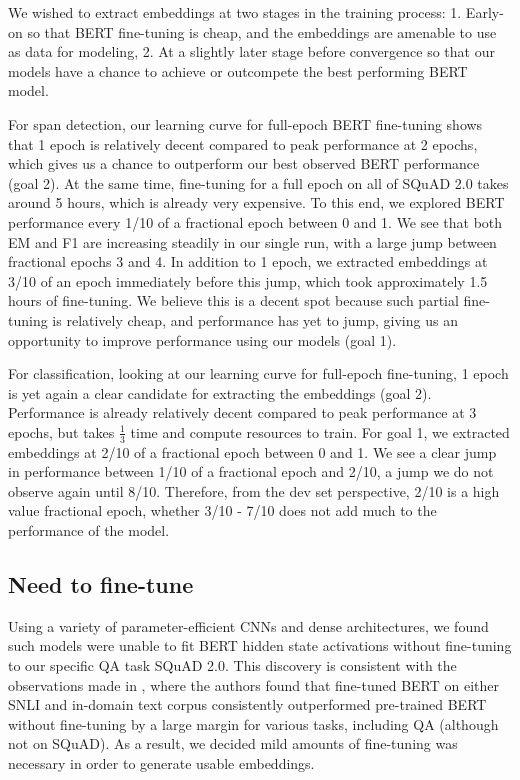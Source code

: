 We wished to extract embeddings at two stages in the training process: 1. Early-on so that BERT fine-tuning is cheap, and the embeddings are amenable to use as data for modeling, 2. At a slightly later stage before convergence so that our models have a chance to achieve or outcompete the best performing BERT model. 

For span detection, our learning curve for full-epoch BERT fine-tuning shows that 1 epoch is relatively decent compared to peak performance at 2 epochs, which gives us a chance to outperform our best observed BERT performance (goal 2). At the same time, fine-tuning for a full epoch on all of SQuAD 2.0 takes around 5 hours, which is already very expensive. To this end, we explored BERT performance every 1/10 of a fractional epoch between 0 and 1. We see that both EM and F1 are increasing steadily in our single run, with a large jump between fractional epochs 3 and 4. In addition to 1 epoch, we extracted embeddings at 3/10 of an epoch immediately before this jump, which took approximately 1.5 hours of fine-tuning. We believe this is a decent spot because such partial fine-tuning is relatively cheap, and performance has yet to jump, giving us an opportunity to improve performance using our models (goal 1).

For classification, looking at our learning curve for full-epoch fine-tuning, 1 epoch is yet again a clear candidate for extracting the embeddings (goal 2). Performance is already relatively decent compared to peak performance at 3 epochs, but takes $\frac{1}{3}$ time and compute resources to train. For goal 1, we extracted embeddings at 2/10 of a fractional epoch between 0 and 1. We see a clear jump in performance between 1/10 of a fractional epoch and 2/10, a jump we do not observe again until 8/10. Therefore, from the dev set perspective, 2/10 is a high value fractional epoch, whether 3/10 - 7/10 does not add much to the performance of the model.

\subsection{Need to fine-tune}
\label{adpx:need_to_fine_tune}

Using a variety of parameter-efficient CNNs and dense architectures, we found such models were unable to fit BERT hidden state activations without fine-tuning to our specific QA task SQuAD 2.0. This discovery is consistent with the observations made in \cite{ma2019universal}, where the authors found that fine-tuned BERT on either SNLI and in-domain text corpus consistently outperformed pre-trained BERT without fine-tuning by a large margin for various tasks, including QA (although not on SQuAD). As a result, we decided mild amounts of fine-tuning was necessary in order to generate usable embeddings.

